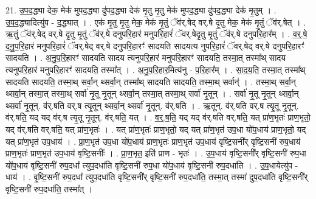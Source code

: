 \documentclass[17pt]{extarticle}
\begin{document}
21. उ॒प॒द॒द्ध्या देक॒ मेक॑ मुपद॒द्ध्या दु॑पद॒द्ध्या देक॑ मृ॒तु मृ॒तु मेक॑ मुपद॒द्ध्या दु॑पद॒द्ध्या देक॑ मृ॒तुम् । . उ॒प॒द॒द्ध्यादित्यु॑प - द॒द्ध्यात् । . एक॑ मृ॒तु मृ॒तु मेक॒ मेक॑ मृ॒तुं ॅव॑र्.षेद् वर्.षे दृ॒तु मेक॒ मेक॑ मृ॒तुं ॅव॑र्.षेत् । . ऋ॒तुं ॅव॑र्.षेद् वर्.षे दृ॒तु मृ॒तुं ॅव॑र्.षे दनुपरि॒हार॑ मनुपरि॒हारं॑ ॅवर्.षेदृ॒तु मृ॒तुं ॅव॑र्.षे दनुपरि॒हार᳚म् । . व॒र्॒.षे॒ द॒नु॒प॒रि॒हार॑ मनुपरि॒हारं॑ ॅवर्.षेद् वर्.षे दनुपरि॒हारꣳ॑ सादयति सादयत्य नुपरि॒हारं॑ ॅवर्.षेद् वर्.षे दनुपरि॒हारꣳ॑ सादयति । . अ॒नु॒प॒रि॒हारꣳ॑ सादयति सादय त्यनुपरि॒हार॑ मनुपरि॒हारꣳ॑ सादयति॒ तस्मा॒त् तस्मा᳚थ् 
सादय त्यनुपरि॒हार॑ मनुपरि॒हारꣳ॑ सादयति॒ तस्मा᳚त् । . अ॒नु॒प॒रि॒हार॒मित्य॑नु - प॒रि॒हार᳚म् । . सा॒द॒य॒ति॒ तस्मा॒त् तस्मा᳚थ् सादयति सादयति॒ तस्मा॒थ् सर्वा॒न् थ्सर्वा॒न् तस्मा᳚थ् सादयति सादयति॒ तस्मा॒थ् सर्वान्॑ । . तस्मा॒थ् सर्वा॒न् थ्सर्वा॒न् तस्मा॒त् तस्मा॒थ् सर्वा॑ नृ॒तू नृ॒तून् थ्सर्वा॒न् तस्मा॒त् तस्मा॒थ् सर्वा॑ नृ॒तून् । . सर्वा॑ नृ॒तू नृ॒तून् थ्सर्वा॒न् थ्सर्वा॑ नृ॒तून्. व॑र्.षति वर्.ष त्यृ॒तून् थ्सर्वा॒न् थ्सर्वा॑ नृ॒तून्. व॑र्.षति । . ऋ॒तून्. व॑र्.षति वर्.ष त्यृ॒तू नृ॒तून्. व॑र्.षति॒ यद् यद् व॑र्.ष त्यृ॒तू नृ॒तून्. व॑र्.षति॒ यत् । . व॒र्॒.ष॒ति॒ यद् यद् व॑र्.षति वर्.षति॒ यत् प्रा॑ण॒भृतः॑ प्राण॒भृतो॒ यद् व॑र्.षति वर्.षति॒ यत् प्रा॑ण॒भृतः॑ । . यत् प्रा॑ण॒भृतः॑ प्राण॒भृतो॒ यद् यत् प्रा॑ण॒भृत॑ उप॒धा यो॑प॒धाय॑ प्राण॒भृतो॒ यद् यत् प्रा॑ण॒भृत॑ उप॒धाय॑ । . प्रा॒ण॒भृत॑ उप॒धा यो॑प॒धाय॑ प्राण॒भृतः॑ प्राण॒भृत॑ उप॒धाय॑ वृष्टि॒सनी᳚र् वृष्टि॒सनी॑ रुप॒धाय॑ प्राण॒भृतः॑ प्राण॒भृत॑ उप॒धाय॑ वृष्टि॒सनीः᳚ । . प्रा॒ण॒भृत॒ इति॑ प्राण - भृतः॑ । . उ॒प॒धाय॑ वृष्टि॒सनी᳚र् वृष्टि॒सनी॑ रुप॒धा यो॑प॒धाय॑ वृष्टि॒सनी॑ रुप॒दधा᳚ त्युप॒दधा॑ति वृष्टि॒सनी॑ रुप॒धा यो॑प॒धाय॑ वृष्टि॒सनी॑ रुप॒दधा॑ति । . उ॒प॒धायेत्यु॑प - धाय॑ । . वृ॒ष्टि॒सनी॑ रुप॒दधा᳚ त्युप॒दधा॑ति वृष्टि॒सनी᳚र् वृष्टि॒सनी॑ रुप॒दधा॑ति॒ तस्मा॒त् तस्मा॑ दुप॒दधा॑ति वृष्टि॒सनी᳚र् वृष्टि॒सनी॑ रुप॒दधा॑ति॒ तस्मा᳚त् । \newline
\end{document}
